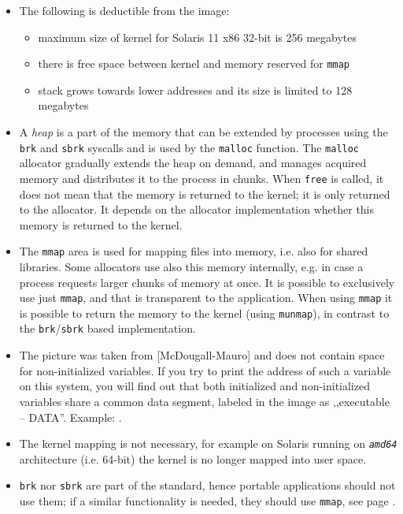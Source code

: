 \begin{itemize}
\item The following is deductible from the image:

\begin{itemize}
\item maximum size of kernel for Solaris 11 x86 32-bit is 256 megabytes
\item there is free space between kernel and memory reserved for \texttt{mmap}
\item stack grows towards lower addresses and its size is limited to 128 megabytes
\end{itemize}

\item A \emph{heap} is a part of the memory that can be extended by processes
using the \texttt{brk} and \texttt{sbrk} syscalls and is used by the
\texttt{malloc} function.  The \texttt{malloc} allocator gradually extends the
heap on demand, and manages acquired memory and distributes it to the process in
chunks.  When \texttt{free} is called, it does not mean that the memory is
returned to the kernel; it is only returned to the allocator.
It depends on the allocator implementation whether this memory is returned
to the kernel.
\item The \texttt{mmap} area is used for mapping files into memory, i.e. also
for shared libraries. Some allocators use also this memory internally,
e.g. in case a process requests larger chunks of memory at once.  It is possible
to exclusively use just \texttt{mmap}, and that is transparent to the
application. When using \texttt{mmap} it is possible to return the memory to the
kernel (using \texttt{munmap}), in contrast to the \texttt{brk}/\texttt{sbrk}
based implementation.
\item The picture was taken from [McDougall-Mauro] and does not contain space
for non-initialized variables. If you try to print the address of such a
variable on this system, you will find out that both initialized and
non-initialized variables share a common data segment, labeled in the image as
,,executable -- DATA''.  Example: .
\item The kernel mapping is not necessary, for example on Solaris running on
\emph{\texttt{amd64}} architecture (i.e. 64-bit) the kernel is no longer mapped
into user space.
\item \texttt{brk} nor \texttt{sbrk} are part of the standard, hence portable
applications should not use them; if a similar functionality is needed, they
should use \texttt{mmap}, see page \pageref{MMAP}.
\end{itemize}

